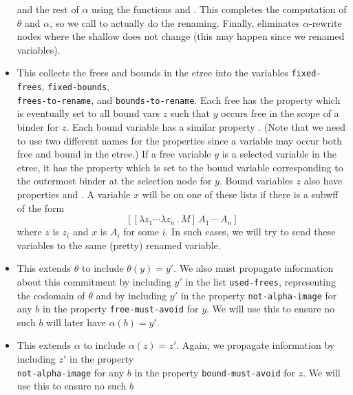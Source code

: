 \begin{itemize}
and the rest of $\alpha$ using the functions {\bf {}}
and {\bf {}}.  This completes the computation of $\theta$ and
$\alpha$, so we call {\bf {}} to actually do the renaming.  Finally, {\bf {}} eliminates $\alpha$-rewrite nodes where the shallow does not change (this may happen since we renamed variables).
\item {\bf {}}  This collects the frees and bounds in the etree
into the variables \verb+fixed-frees+, \verb+fixed-bounds+,  \\
\verb+frees-to-rename+, and \verb+bounds-to-rename+.
Each free has the property {\tt {}} which is eventually set to all bound vars $z$
such that $y$ occurs free in the scope of a binder for $z$.  Each bound variable has
a similar property {\tt {}}.  (Note that we need to use two different names for the properties
since a variable may occur both free and bound in the etree.)
If a free variable $y$ is a selected variable in the etree,
it has the property {\tt {}} which is set to the bound variable corresponding to the outermost
binder at the selection node for $y$.
Bound variables $z$ also have properties {\tt {}}
and {\tt {}}.  A variable $x$ will be on one of these lists if
there is a subwff of the form
$$[[\lambda z_1 \cdots \lambda z_n \, . \, M] \, A_1 \, \cdots\, A_n]$$
where $z$ is $z_i$ and $x$ is $A_i$ for some $i$.  In such cases, we will try to
send these variables to the same (pretty) renamed variable.
\item {\bf {}}  This extends $\theta$ to include $\theta(y) = y'$.
We also must propagate information about this commitment by including $y'$ in the list \verb+used-frees+,
representing the codomain of $\theta$ and by including $y'$ in the property \verb+not-alpha-image+
for any $b$ in the property \verb+free-must-avoid+ for $y$.  We will use this to ensure no such $b$
will later have $\alpha(b) = y'$.
\item {\bf {}} This extends $\alpha$ to include $\alpha(z) = z'$.
Again, we propagate information by including $z'$ in the property \\
\verb+not-alpha-image+
for any $b$ in the property \verb+bound-must-avoid+ for $z$.  We will use this to ensure no such $b$

\end{itemize}
